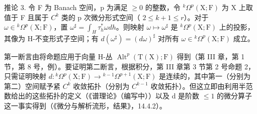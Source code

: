 推论 3. 令 F 为 Banach 空间，p 为满足 \(\geq 0\) 的整数，令 \(^{k}\Omega^{p}(\mathrm{X};\mathrm{F})\) 为 X 上取值于 F 且属于 \(C^{k}\) 类的 p 次微分形式空间（ \(2 \leq k + 1 \leq r\)）。对于 \(\omega \in {}^{k}\Omega^{p}(\mathrm{X};\mathrm{F})\)，置 \(\omega^{\sharp} = \int_{H} \tau_{h}^{*}\omega dh\)。则映射 \(\omega \mapsto \omega^{\sharp}\) 是 \(^{k}\Omega^{p}(\mathrm{X};\mathrm{F})\) 上的投影，其像为 H-不变形式子空间；有 \(d(\omega^{\sharp}) = (d\omega)^{\sharp}\) 对所有 \(\omega \in {}^{k}\Omega^{p}(\mathrm{X};\mathrm{F})\) 成立。

第一断言由将命题应用于向量 H-丛 \(\operatorname{Alt}^{p}(\mathrm{T}(\mathrm{X});\mathrm{F})\) 得到（第 III 章，第 1 节，第 8 号，例）。要证明第二断言，根据积分，第 III 章第 3 节第 2 号命题 2，只需证明映射 \(d:{}^{k}\varOmega^{p}(\mathrm{X};\mathrm{F})\to{}^{k-1}\varOmega^{p+1}(\mathrm{X};\mathrm{F})\) 是连续的，其中第一（分别为第二）空间赋予紧 \(C^{k}\) 收敛拓扑（分别为 \(C^{k-1}\) 收敛拓扑）。但这立即由利用半范数给出的这些拓扑的定义（《谱理论》（编写中））以及 d 是阶数 \(\leq 1\) 的微分算子这一事实得到（《微分与解析流形，结果》，14.4.2）。

